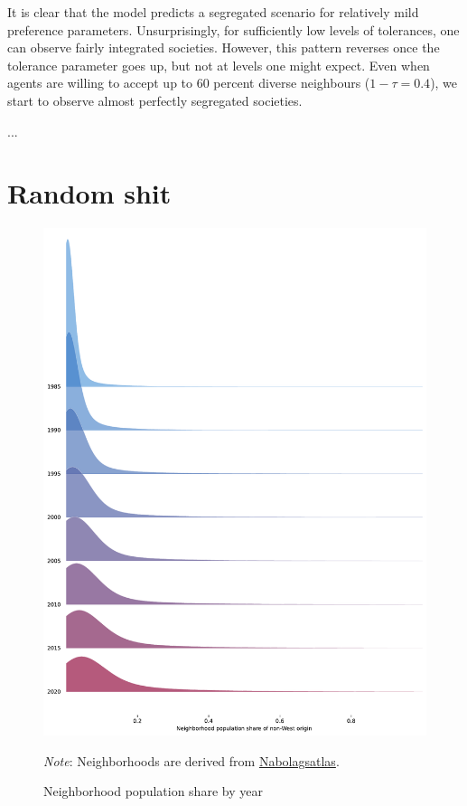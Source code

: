 \documentclass[../main.tex]{subfiles}
\begin{document}
It is clear that the model predicts a segregated scenario for relatively mild preference parameters. Unsurprisingly, for sufficiently low levels of tolerances, one can observe fairly integrated societies. However, this pattern reverses once the tolerance parameter goes up, but not at levels one might expect. Even when agents are willing to accept up to 60 percent diverse neighbours ($1-\tau = 0.4$), we start to observe almost perfectly segregated societies.

...

\section{Random shit}
\label{sec:appendix_figs}
\begin{figure}[H]
    \centering
    \caption{Neighborhood population share by year}
    \includegraphics[width=0.7\linewidth]{figs/neighborhood_non_west_share_density_1985_2000.pdf}
        \begin{minipage}{.9\linewidth}
        \footnotesize \textit{Note}: Neighborhoods are derived from \href{https://www.nabolagsatlas.dk/}{Nabolagsatlas}. 
    \end{minipage}
\end{figure}
\end{document}
